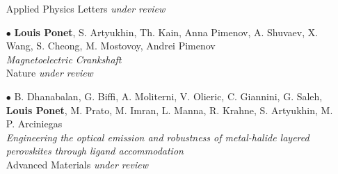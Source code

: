 \begin{itemize}
	Applied Physics Letters {\it under review}
	\item[$\bullet$]
	{\bf Louis Ponet}, S. Artyukhin, Th. Kain, Anna Pimenov, A. Shuvaev, X. Wang, S. Cheong, M. Mostovoy, Andrei Pimenov\\
	{\it Magnetoelectric Crankshaft}\\
	Nature {\it under review}
	\item[$\bullet$]
	B. Dhanabalan, G. Biffi, A. Moliterni, V. Olieric, C. Giannini, G. Saleh, {\bf Louis Ponet}, M. Prato, M. Imran, L. Manna, R. Krahne, S. Artyukhin, M. P. Arciniegas\\
	{\it Engineering the optical emission and robustness of metal-halide layered perovskites through ligand accommodation}\\
	Advanced Materials {\it under review}
\end{itemize}
